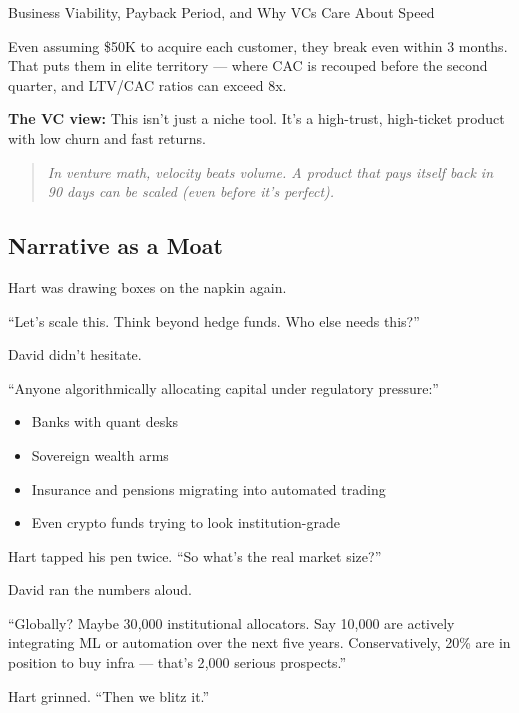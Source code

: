 \begin{TechnicalSidebar}{Business Viability, Payback Period, and Why VCs Care About Speed}
  \medskip
  
  Even assuming \$50K to acquire each customer, they break even within 3 months.  
  That puts them in elite territory — where CAC is recouped before the second quarter, and LTV/CAC ratios can exceed 8x.
  
  \medskip
  
  \textbf{The VC view:}  
  This isn’t just a niche tool. It’s a high-trust, high-ticket product with low churn and fast returns.
  
  \begin{quote}
  \textit{In venture math, velocity beats volume.  
  A product that pays itself back in 90 days can be scaled   
  (even before it's perfect).}
  \end{quote}
  
\end{TechnicalSidebar}
  

\medskip

\subsection{Narrative as a Moat}


Hart was drawing boxes on the napkin again.

``Let’s scale this. Think beyond hedge funds. Who else needs this?''

David didn’t hesitate.

``Anyone algorithmically allocating capital under regulatory pressure:''

\begin{itemize}
  \item Banks with quant desks  
  \item Sovereign wealth arms  
  \item Insurance and pensions migrating into automated trading  
  \item Even crypto funds trying to look institution-grade
\end{itemize}

Hart tapped his pen twice. ``So what’s the real market size?''

David ran the numbers aloud.

``Globally? Maybe 30{,}000 institutional allocators.  
Say 10{,}000 are actively integrating ML or automation over the next five years.  
Conservatively, 20\% are in position to buy infra — that’s 2{,}000 serious prospects.''

Hart grinned. ``Then we blitz it.''

